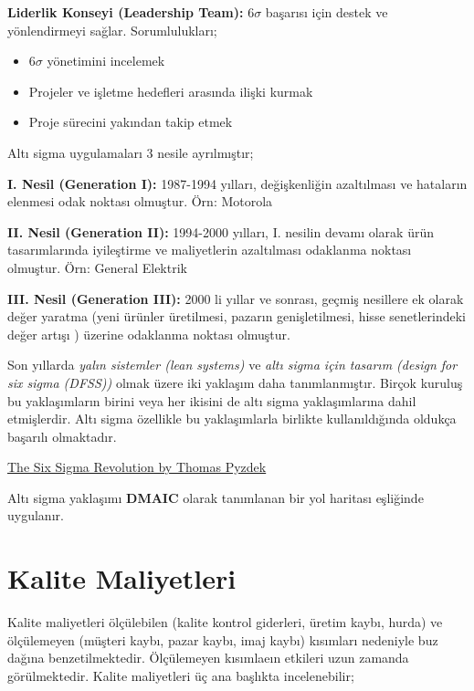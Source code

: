 \documentclass[
]{book}
\providecommand{\tightlist}{%
  \setlength{\itemsep}{0pt}\setlength{\parskip}{0pt}}
\begin{document}
\textbf{Liderlik Konseyi (Leadership Team):} 6\(\sigma\) başarısı için destek ve yönlendirmeyi sağlar. Sorumlulukları;

\begin{itemize}
\tightlist
\item
  6\(\sigma\) yönetimini incelemek
\item
  Projeler ve işletme hedefleri arasında ilişki kurmak
\item
  Proje sürecini yakından takip etmek
\end{itemize}

Altı sigma uygulamaları 3 nesile ayrılmıştır;

\textbf{I. Nesil (Generation I):} 1987-1994 yılları, değişkenliğin azaltılması ve hataların elenmesi odak noktası olmuştur. Örn: Motorola

\textbf{II. Nesil (Generation II):} 1994-2000 yılları, I. nesilin devamı olarak ürün tasarımlarında iyileştirme ve maliyetlerin azaltılması odaklanma noktası olmuştur. Örn: General Elektrik

\textbf{III. Nesil (Generation III):} 2000 li yıllar ve sonrası, geçmiş nesillere ek olarak değer yaratma (yeni ürünler üretilmesi, pazarın genişletilmesi, hisse senetlerindeki değer artışı ) üzerine odaklanma noktası olmuştur.

Son yıllarda \emph{yalın sistemler (lean systems)} ve \emph{altı sigma için tasarım (design for six sigma (DFSS))} olmak üzere iki yaklaşım daha tanımlanmıştır. Birçok kuruluş bu yaklaşımların birini veya her ikisini de altı sigma yaklaşımlarına dahil etmişlerdir. Altı sigma özellikle bu yaklaşımlarla birlikte kullanıldığında oldukça başarılı olmaktadır.

\href{http://www.bxlnc.com/download/The-Six-Sigma-Revolution.pdf}{The Six Sigma Revolution by Thomas Pyzdek}

Altı sigma yaklaşımı \textbf{DMAIC} olarak tanımlanan bir yol haritası eşliğinde uygulanır.

\hypertarget{kalite-maliyetleri}{%
\section{Kalite Maliyetleri}\label{kalite-maliyetleri}}

Kalite maliyetleri ölçülebilen (kalite kontrol giderleri, üretim kaybı, hurda) ve ölçülemeyen (müşteri kaybı, pazar kaybı, imaj kaybı) kısımları nedeniyle buz dağına benzetilmektedir. Ölçülemeyen kısımlaeın etkileri uzun zamanda görülmektedir. Kalite maliyetleri üç ana başlıkta incelenebilir;
\end{document}
